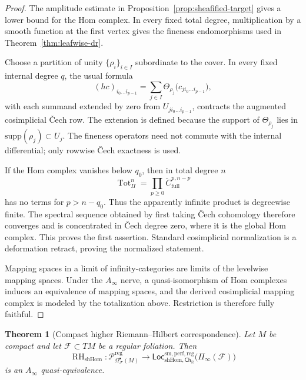 \documentclass[12pt]{amsart}
\newtheorem{thm}{Theorem}[section]
\theoremstyle{definition}
\theoremstyle{remark}
\numberwithin{equation}{section}
\newcommand{\supp}{\mbox{supp}}
\newcommand{\CF}{{\mathcal F}}
\newcommand{\R}{{\mathbb{R}}}
\newcommand{\1}{{\mathbb{1}}}
\newcommand{\Ch}{\mathsf{Ch}}
\newcommand{\Loc}{\mathsf{Loc}}
\newcommand{\RH}{\operatorname{RH}}
\begin{document}
\begin{proof}
The amplitude estimate in
Proposition~\ref{prop:sheafified-target} gives a lower bound for the
Hom complex.  In every fixed total degree, multiplication by a smooth
function at the first vertex gives the fineness endomorphisms used in
Theorem~\ref{thm:leafwise-dr}.

Choose a partition of unity $\{\rho_i\}_{i\in I}$ subordinate to the
cover.  In every fixed internal degree $q$, the usual formula
\[
 (hc)_{i_0\ldots i_{p-1}}
 =
 \sum_{j\in I}
 \Theta_{\rho_j}
 \bigl(c_{j i_0\ldots i_{p-1}}\bigr),
\]
with each summand extended by zero from
$U_{j i_0\ldots i_{p-1}}$, contracts the augmented cosimplicial
\v{C}ech row.  The extension is defined because the support of
$\Theta_{\rho_j}$ lies in $\supp(\rho_j)\subset U_j$.  The fineness
operators need not commute with the internal differential; only
rowwise \v{C}ech exactness is used.

If the Hom complex vanishes below $q_0$, then in total degree $n$
\[
 \operatorname{Tot}_{\Pi}^{n}
 =
 \prod_{p\geq0}
 \check C_{\mathrm{full}}^{p,n-p}
\]
has no terms for $p>n-q_0$.  Thus the apparently infinite product is
degreewise finite.  The spectral sequence obtained by first taking
\v{C}ech cohomology therefore converges and is concentrated in
\v{C}ech degree zero, where it is the global Hom complex.  This proves
the first assertion.  Standard cosimplicial normalization is a
deformation retract, proving the normalized statement.

Mapping spaces in a limit of infinity-categories are limits of the
levelwise mapping spaces.  Under the $A_\infty$ nerve, a
quasi-isomorphism of Hom complexes induces an equivalence of mapping
spaces, and the derived cosimplicial mapping complex is modeled by the
totalization above.  Restriction is therefore fully faithful.
\end{proof}

\begin{thm}[Compact higher Riemann--Hilbert correspondence]
\label{thm:compact-rh}
Let $M$ be compact and let $\CF\subset TM$ be a regular foliation.
Then
\[
 \RH_{\mathrm{shHom}}:
 \mathcal P_{\Omega^\bullet_{\CF}(M)}^{\mathrm{reg}}
 \longrightarrow
 \Loc_{\mathrm{shHom},\Ch_{\R}}^{\mathrm{sm,perf,reg}}
 \bigl(\Pi_\infty(\CF)\bigr)
\]
is an $A_\infty$ quasi-equivalence.
\end{thm}
\end{document}
